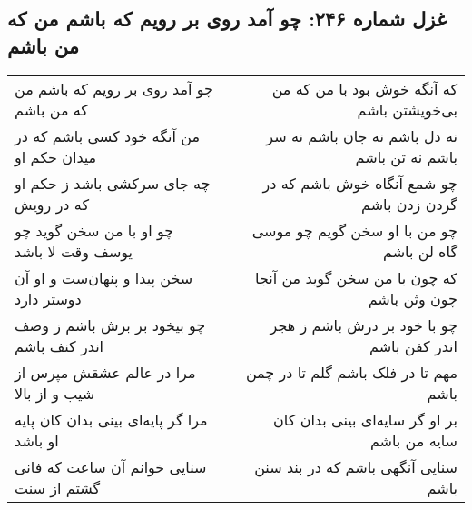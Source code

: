 \begin{center}
\section*{غزل شماره ۲۴۶: چو آمد روی بر رویم که باشم من که من باشم}
\label{sec:246}
\begin{longtable}{l p{0.5cm} r}
چو آمد روی بر رویم که باشم من که من باشم
&&
که آنگه خوش بود با من که من بی‌خویشتن باشم
\\
من آنگه خود کسی باشم که در میدان حکم او
&&
نه دل باشم نه جان باشم نه سر باشم نه تن باشم
\\
چه جای سرکشی باشد ز حکم او که در رویش
&&
چو شمع آنگاه خوش باشم که در گردن زدن باشم
\\
چو او با من سخن گوید چو یوسف وقت لا باشد
&&
چو من با او سخن گویم چو موسی گاه لن باشم
\\
سخن پیدا و پنهان‌ست و او آن دوستر دارد
&&
که چون با من سخن گوید من آنجا چون وثن باشم
\\
چو بیخود بر برش باشم ز وصف اندر کنف باشم
&&
چو با خود بر درش باشم ز هجر اندر کفن باشم
\\
مرا در عالم عشقش مپرس از شیب و از بالا
&&
مهم تا در فلک باشم گلم تا در چمن باشم
\\
مرا گر پایه‌ای بینی بدان کان پایه او باشد
&&
بر او گر سایه‌ای بینی بدان کان سایه من باشم
\\
سنایی خوانم آن ساعت که فانی گشتم از سنت
&&
سنایی آنگهی باشم که در بند سنن باشم
\\
\end{longtable}
\end{center}
